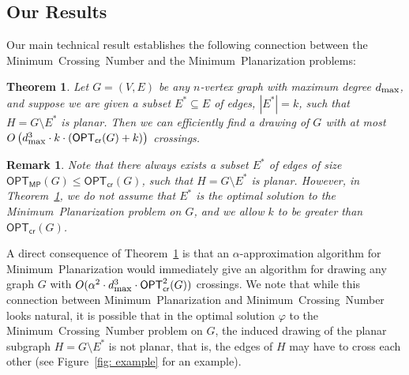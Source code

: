 \documentclass[twoside,leqno,twocolumn]{article}
\newcommand{\sse}{\subseteq}
\newtheorem{remark}{Remark}[section]
\newtheorem{remark}{Remark}
\newtheorem{theorem}{Theorem}
\renewcommand{\phi}{\varphi}
\newcommand{\MP}{\mbox{\sf Minimum Planarization}\xspace}
\newcommand{\MCN}{\mbox{\sf Minimum Crossing Number}\xspace}
\newcommand{\optmp}[1]{\mathsf{OPT}_{\mathsf{MP}}(#1)}
\newcommand{\optcro}[1]{\mathsf{OPT}_{\mathsf{cr}}(#1)}
\newcommand{\optcrosq}[1]{\mathsf{OPT}^{2}_{\mathsf{cr}}(#1)}
\newcommand{\dmax}{d_{\mbox{\textup{\footnotesize{max}}}}}
\begin{document}
\iffalse
Our main technical result establishes the following connection between \MCN and \MP: Suppose we are given an $n$-vertex graph $G=(V,E)$ with maximum degree $\dmax$, and a subset $E^*\sse E$ of edges, where $|E^*|=k$, such that $G\setminus E^*$ is planar. Then we can find a drawing of $G$ with at most $O(k\cdot (k+\optcro{G}))$ crossings. This result immediately gives improved algorithms for the \MCN problem:  using the planar separator theorem, it is easy to show that any graph $G$ has such a subset $E^*$ of size $O(\dmax\cdot \sqrt n)\optcro{G}$, and this set can be found efficiently. This gives an algorithm for drawing graph $G$ with $O(\dmax\cdot \sqrt n)\optcro{G}^2$ crossings, and implies an  $O(\dmax\cdot n^{3/4}\cdot \log^2n)$-approximation for general graphs, an $O(n^{3/4}\cdot \log^2n)$-approximation for bounded degree graphs. The above framework also allows us to obtain simple approximation algorithms for several special families of graphs that have been studied before, such as apex graphs, bounded genus graphs, and so on. We state the results formally below.
\fi

\subsection{Our Results}
Our main technical result establishes the following connection between the \MCN and the \MP problems:

\begin{theorem}\label{thm:main}
Let $G=(V,E)$ be any $n$-vertex graph with maximum degree $\dmax$, and suppose we are given a subset $E^*\sse E$ of edges, $|E^*|=k$, such that $H=G\setminus E^*$ is planar. Then we can efficiently find a drawing of $G$ with at most $O\left(\dmax^3\cdot k\cdot (\optcro{G}+k)\right )$ crossings.
\end{theorem}
\begin{remark}
Note that there always exists a subset $E^*$ of edges of size $\optmp{G}\leq \optcro{G}$, such that $H=G\setminus E^*$ is planar.
However, in Theorem~\ref{thm:main}, we do not assume that $E^*$ is the optimal solution to the \MP problem on $G$, and we allow
$k$ to be greater than $\optcro{G}$.
\end{remark}


A direct consequence of Theorem~\ref{thm:main} is that an $\alpha$-approximation algorithm for \MP would immediately give an algorithm for drawing any graph $G$ with $O(\alpha^2 \cdot \dmax^3\cdot \optcrosq{G})$ crossings. We note that while this connection between \MP and \MCN looks natural, it is possible that in the optimal solution $\phi$ to the \MCN problem on $G$, the induced drawing of the planar subgraph $H=G\setminus E^*$ is not planar, that is, the edges of $H$ may have to cross each other (see Figure~\ref{fig: example} for an example).
\end{document}
